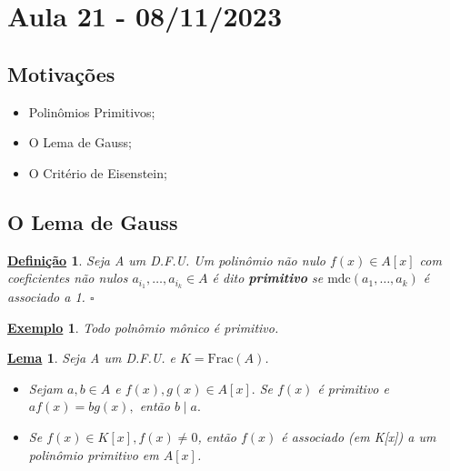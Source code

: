 \documentclass{article}
\newtheorem*{def*}{\underline{Defini\c c\~ao}}
\newtheorem*{lemma*}{\underline{Lema}}
\newtheorem{example}{\underline{Exemplo}}
\begin{document}
    \section{Aula 21 - 08/11/2023}
    \subsection{Motivações} 
    \begin{itemize}
      \item Polinômios Primitivos;
      \item O Lema de Gauss;
      \item O Critério de Eisenstein;
    \end{itemize}
    \subsection{O Lema de Gauss}
    \begin{def*}
      Seja A um D.F.U. Um polinômio não nulo \(f(x)\in A[x]\) com coeficientes não nulos \(a_{i_{1}},\dotsc, a_{i_{k}}\in A\) é dito
      \textbf{primitivo} se \(\mathrm{mdc}(a_{1}, \dotsc, a_{k})\) é associado a 1. \(\square\)
    \end{def*}
    \begin{example}
      Todo polnômio mônico é primitivo.
    \end{example}
    \begin{lemma*}
      Seja A um D.F.U. e \(K = \mathrm{Frac}(A)\).
      \begin{itemize}
        \item[1)] Sejam \(a, b\in A\) e \(f(x), g(x)\in A[x].\) Se \(f(x)\) é primitivo e \(af(x) = bg(x),\)
          então \(b\mid a.\)
        \item[2)] Se \(f(x)\in K[x], f(x)\neq 0\), então \(f(x)\) é associado (em K[x]) a um polinômio primitivo em \(A[x]\).
      \end{itemize}
    \end{lemma*}
\end{document}
